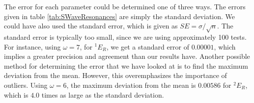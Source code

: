 \documentclass[Dissertation.tex]{subfiles}
\begin{document}
The error for each parameter could be determined one of three ways.  The errors given in table \ref{tab:SWaveResonances} are simply the standard deviation.  We could have also used the standard error, which is given as $SE = \sigma / \sqrt{n}$.  The standard error is typically too small, since we are using approximately 100 tests.  For instance, using $\omega = 7$, for $^1E_R$, we get a standard error of $0.00001$, which implies a greater precision and agreement than our results have.  Another possible method for determining the error that we have looked at is to find the maximum deviation from the mean.  However, this overemphasizes the importance of outliers.  Using $\omega = 6$, the maximum deviation from the mean is $0.00586$ for $^2E_R$, which is $4.0$ times as large as the standard deviation. 






\biblio
\end{document}
